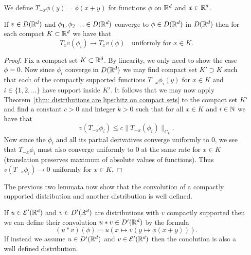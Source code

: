 \documentclass[twoside, a4paper, 10pt]{amsart}
\begin{document}
We define $T_{-x}\phi(y) = \phi(x+y)$ for functions $\phi$ on $\mathbb{R}^d$ and $x \in \mathbb{R}^d$.

\begin{lemma}\label{lemma: T_x v continuous} If $v \in D(\mathbb{R}^d)$ and $\phi_1, \phi_2 \ldots \in D(\mathbb{R}^d)$ converge to $\phi \in D(\mathbb{R}^d)$ in $D(\mathbb{R}^d)$ then for each compact $K \subset \mathbb{R}^d$ we have that $$T_x v (\phi_i) \to T_xv (\phi) \quad \text{uniformly for } x \in K.$$

\end{lemma}

\begin{proof} Fix a compact set $K \subset \mathbb{R}^d$. By linearity, we only need to show the case $\phi=0$. Now since $\phi_i$ converge in $D(\mathbb{R}^d)$ we may find compact set $K' \supset K$ such that each of the compactly supported functions $T_{-x} \phi_i(y)$ for $x \in K$ and $i \in \{1,2,\ldots \}$ have support inside $K'$. It follows that we may now apply Theorem~\ref{thm: distributions are lipschitz on compact sets} to the compact set $K'$ and find a constant $c>0$ and integer $k>0$ such that for all $x \in K$ and $i \in \mathbb{N}$ we have that $$v(T_{-x}\phi_i) \leq c \| T_{-x}(\phi_i) \|_{C_k}.$$ Now since the $\phi_i$ and all its partial derivatives converge uniformly to $0$, we see that $T_{-x}\phi_i$ must also converge uniformly to $0$ at the same rate for $x \in K$ (translation preserves maximum of absolute values of functions). Thus $v(T_{-x}\phi_i) \to 0$ uniformly for $x \in K$. \end{proof}

The previous two lemmata now show that the convolution of a compactly supported distribution and another distribution is well defined.

\begin{mydef} If $u \in \mathcal{E}'(\mathbb{R}^d)$ and $v \in D'(\mathbb{R}^d)$ are distributions with $v$ compactly supported then we can define their convolution $u * v \in D'(\mathbb{R}^d)$ by the formula $$(u * v)(\phi) = u(x \mapsto v(y \mapsto \phi(x+y))).$$ If instead we assume $u \in D'(\mathbb{R}^d)$ and $v \in \mathcal{E}'(\mathbb{R}^d)$ then the conolution is also a well defined distribution.

\end{mydef}
\end{document}
